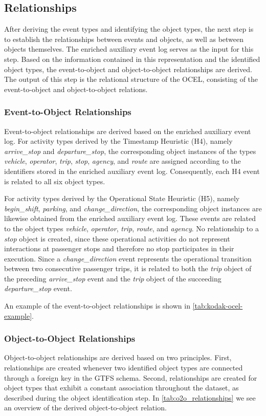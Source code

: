\subsection{Relationships}
After deriving the event types and identifying the object types, the next step is to establish the relationships between events and objects, as well as between objects themselves. The enriched auxiliary event log serves as the input for this step. Based on the information contained in this representation and the identified object types, the event-to-object and object-to-object relationships are derived. The output of this step is the relational structure of the OCEL, consisting of the event-to-object and object-to-object relations.

\subsubsection{Event-to-Object Relationships}
Event-to-object relationships are derived based on the enriched auxiliary event log. For activity types derived by the Timestamp Heuristic (H4), namely \textit{arrive\_stop} and \textit{departure\_stop}, the corresponding object instances of the types \textit{vehicle}, \textit{operator}, \textit{trip}, \textit{stop}, \textit{agency}, and \textit{route} are assigned according to the identifiers stored in the enriched auxiliary event log. Consequently, each H4 event is related to all six object types.

For activity types derived by the Operational State Heuristic (H5), namely \textit{begin\_shift}, \textit{parking}, and \textit{change\_direction}, the corresponding object instances are likewise obtained from the enriched auxiliary event log. These events are related to the object types \textit{vehicle}, \textit{operator}, \textit{trip}, \textit{route}, and \textit{agency}. No relationship to a \textit{stop} object is created, since these operational activities do not represent interactions at passenger stops and therefore no stop participates in their execution.
Since a \textit{change\_direction} event represents the operational
transition between two consecutive passenger trips, it is related to both
the \textit{trip} object of the preceding \textit{arrive\_stop} event and
the \textit{trip} object of the succeeding \textit{departure\_stop} event.

An example of the event-to-object relationships is shown in \autoref{tab:kodak-ocel-example}.

\subsubsection{Object-to-Object Relationships}
Object-to-object relationships are derived based on two principles. First, relationships are created whenever two identified object types are connected through a foreign key in the GTFS schema. Second, relationships are created for object types that exhibit a constant association throughout the dataset, as described during the object identification step.
In \autoref{tab:o2o_relationships} we see an overview of the derived object-to-object relation.



